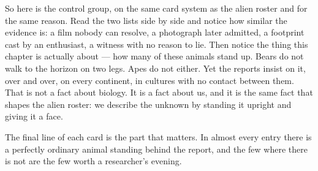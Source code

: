 
So here is the control group, on the same card system as the alien roster and
for the same reason. Read the two lists side by side and notice how similar the
evidence is: a film nobody can resolve, a photograph later admitted, a
footprint cast by an enthusiast, a witness with no reason to lie. Then notice
the thing this chapter is actually about --- how many of these animals stand
up. Bears do not walk to the horizon on two legs. Apes do not either. Yet the
reports insist on it, over and over, on every continent, in cultures with no
contact between them. That is not a fact about biology. It is a fact about us,
and it is the same fact that shapes the alien roster: we describe the unknown
by standing it upright and giving it a face.

The final line of each card is the part that matters. In almost every entry
there is a perfectly ordinary animal standing behind the report, and the few
where there is not are the few worth a researcher's evening.

\swampfieldon
\rosterwidesix

